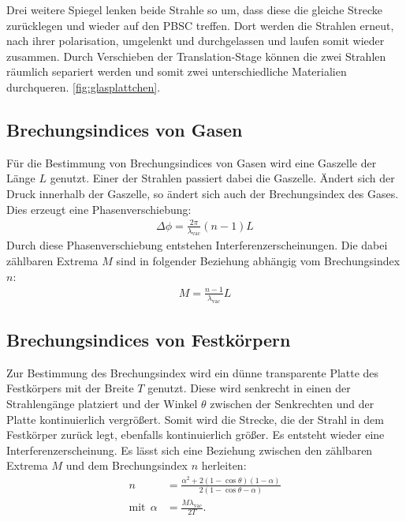 Drei weitere Spiegel lenken beide Strahle so um, dass diese die gleiche Strecke zurücklegen und wieder auf
den PBSC treffen. Dort werden die Strahlen erneut, nach ihrer polarisation,
umgelenkt und durchgelassen und laufen somit wieder zusammen.
Durch Verschieben der Translation-Stage können die zwei Strahlen räumlich separiert
werden und somit zwei unterschiedliche Materialien durchqueren.
\ref{fig:glasplattchen}.


\subsection{Brechungsindices von Gasen}
Für die Bestimmung von Brechungsindices von Gasen wird eine Gaszelle
der Länge $L$ genutzt. Einer der Strahlen passiert dabei die Gaszelle.
Ändert sich der Druck innerhalb der Gaszelle, so ändert sich auch
der Brechungsindex des Gases. Dies erzeugt eine Phasenverschiebung:
\begin{align}
  \Delta\phi=\frac{2\pi}{\lambda_\mathrm{vac}}(n-1)L
\end{align}
Durch diese Phasenverschiebung entstehen Interferenzerscheinungen.
Die dabei zählbaren Extrema $M$ sind in folgender Beziehung abhängig
vom Brechungsindex $n$:
\begin{align}
  M=\frac{n-1}{\lambda_\mathrm{vac}}L\label{eqn:gas}
\end{align}

\subsection{Brechungsindices von Festkörpern}
Zur Bestimmung des Brechungsindex wird ein dünne transparente
Platte des Festkörpers mit der Breite $T$ genutzt. Diese wird senkrecht in einen der Strahlengänge
platziert und der Winkel $\theta$ zwischen der Senkrechten und der Platte kontinuierlich vergrößert. Somit wird die
Strecke, die der Strahl in dem Festkörper zurück legt, ebenfalls kontinuierlich größer.
Es entsteht wieder eine Interferenzerscheinung.
Es lässt sich eine Beziehung zwischen den zählbaren Extrema $M$
und dem Brechungsindex $n$ herleiten:
\begin{align}%
  n&=\frac{\alpha^2+2(1-\cos\theta)(1-\alpha)}{2(1-\cos\theta-\alpha)}\\
  \text{mit} \ \ \alpha&= \frac{M\lambda_\mathrm{vac}}{2T}.
\end{align}
